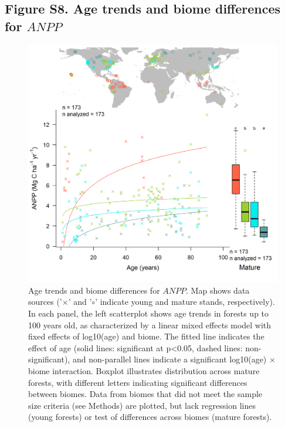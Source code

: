 \documentclass[
]{article}
\begin{document}
\newpage

\hypertarget{figure-s8.-age-trends-and-biome-differences-for-anpp}{%
\subsection{\texorpdfstring{Figure S8. Age trends and biome differences
for
\(ANPP\)}{Figure S8. Age trends and biome differences for ANPP}}\label{figure-s8.-age-trends-and-biome-differences-for-anpp}}

\begin{figure}[H]

{\centering \includegraphics[width=1\linewidth]{tables_figures/age_trends/ANPP_with_map} 

}

\caption{Age trends and biome differences for $ANPP$. Map shows data sources ('$\times$' and '$\circ$' indicate young and mature stands, respectively). In each panel, the left scatterplot shows age trends in forests up to 100 years old, as characterized by a linear mixed effects model with fixed effects of log10(age) and biome. The fitted line indicates the effect of age (solid lines: significant at p<0.05, dashed lines: non-significant), and non-parallel lines indicate a significant log10(age) $\times$ biome interaction. Boxplot illustrates distribution across mature forests, with different letters indicating significant differences between biomes. Data from biomes that did not meet the sample size criteria (see Methods) are plotted, but lack regression lines (young forests) or test of differences across biomes (mature forests).}\label{fig:unnamed-chunk-11}
\end{figure}
\end{document}
